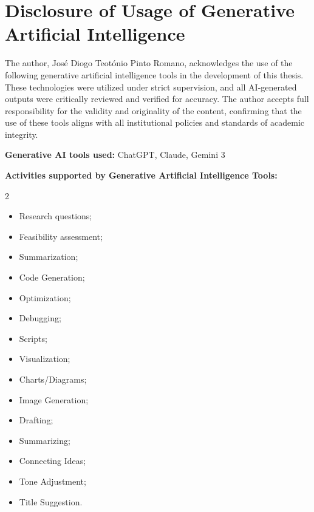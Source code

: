
%
\chapter*{Disclosure of Usage of Generative Artificial
Intelligence}
\label{ai:disclosure}

The author, José Diogo Teotónio Pinto Romano, acknowledges the use of the following generative
artificial intelligence tools in the development of this thesis. These technologies were
utilized under strict supervision, and all AI-generated outputs were critically reviewed and
verified for accuracy. The author accepts full responsibility for the validity and originality
of the content, confirming that the use of these tools aligns with all institutional policies
and standards of academic integrity.

\textbf{Generative AI tools used: }ChatGPT, Claude, Gemini 3


\textbf{Activities supported by Generative Artificial Intelligence Tools:}
\begin{multicols}{2}
    \begin{itemize}[nosep, leftmargin=*] %
        \item Research questions;
        \item Feasibility assessment;
        \item Summarization;
        \item Code Generation;
        \item Optimization;
        \item Debugging;
        \item Scripts;
        \item Visualization;
        \item Charts/Diagrams;
        \item Image Generation;
        \item Drafting;
        \item Summarizing;
        \item Connecting Ideas;
        \item Tone Adjustment;
        \item Title Suggestion.
    \end{itemize}
    \end{multicols}
